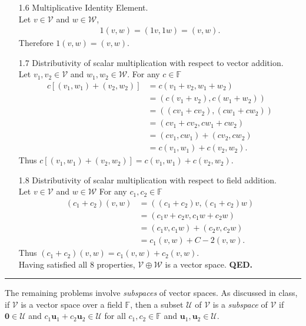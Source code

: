 \documentclass[12pt]{amsart}
\newcommand{\1}{\mathbbm{1}}
\numberwithin{equation}{section}
\numberwithin{Theorem}{section}
\theoremstyle{plain} %
\theoremstyle{definition}
\theoremstyle{remark}
\begin{document}
\begin{enumerate}[1.]
\begin{itemize}
	\item[1.6]  Multiplicative Identity Element. \\
	Let $v \in \mathcal{V}$ and $w \in \mathcal{W}$,
	\begin{align*}
		1(v,w) = (1v,1w) = (v,w).
	\end{align*}
	Therefore $1(v,w) = (v,w)$. \\
	
	\item[1.7]  Distributivity of scalar multiplication with respect to vector addition. \\
	Let $v_1,v_2 \in \mathcal{V}$ and $w_1,w_2 \in \mathcal{W}$.
	For any $c \in\mathbb{F}$
	\begin{align*}
		c[(v_1,w_1)+(v_2,w_2)]
		&= c(v_1+v_2,w_1+w_2) \\
		&= (c(v_1+v_2),c(w_1+w_2)) \\
		&= ((cv_1+cv_2),(cw_1+cw_2)) \\
		&= (cv_1+cv_2,cw_1+cw_2) \\
		&= (cv_1,cw_1) + (cv_2,cw_2) \\
		&= c(v_1,w_1) + c(v_2,w_2).
	\end{align*}
	Thus $c[(v_1,w_1)+(v_2,w_2)] = c(v_1,w_1) + c(v_2,w_2)$. \\
	
	\item[1.8]  Distributivity of scalar multiplication with respect to field addition. \\
	Let $v \in \mathcal{V}$ and $w \in \mathcal{W}$
	For any $c_1, c_2 \in\mathbb{F}$
	\begin{align*}
		(c_1+c_2)(v,w)
		&= ((c_1+c_2)v,(c_1+c_2)w) \\
		&= (c_1v+c_2v,c_1w+c_2w) \\
		&= (c_1v,c_1w)+(c_2v,c_2w) \\
		&= c_1(v,w)+C-2(v,w).
	\end{align*}
	Thus $(c_1+c_2)(v,w) = c_1(v,w)+c_2(v,w)$. \\
	
Having satisfied all 8 properties, $\mathcal{V}\oplus\mathcal{W}$ is a vector space. \textbf{QED.}
	
\end{itemize}


\end{enumerate}
\bigskip\hrule\bigskip

The remaining problems involve \textit{subspaces} of vector spaces.
As discussed in class, if $\mathcal{V}$ is a vector space over a field $\mathbb{F}$,
then a subset $\mathcal{U}$ of $\mathcal{V}$ is a \textit{subspace} of $\mathcal{V}$ if $\mathbf{0}\in\mathcal{U}$ and $c_1\mathbf{u}_1+c_2\mathbf{u}_2\in\mathcal{U}$ for all $c_1,c_2\in\mathbb{F}$ and $\mathbf{u}_1,\mathbf{u}_2\in\mathcal{U}$.\bigskip
\end{document}
